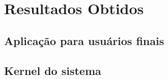 \section{Resultados Obtidos}

\subsection{Aplicação para usuários finais}
\subsection{Kernel do sistema}